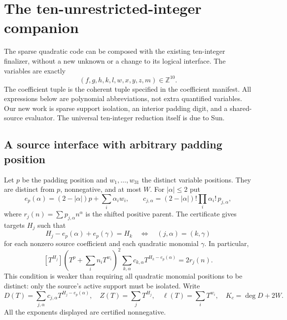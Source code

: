 \section{The ten-unrestricted-integer companion}
\label{sec:sparse-sun}
The sparse quadratic code can be composed with the existing ten-integer
finalizer, without a new unknown or a change to its logical interface.
The variables are exactly
\[
(f,g,h,k,l,w,x,y,z,m)\in\mathbb Z^{10}.
\]
The coefficient tuple is the coherent tuple specified in the coefficient
manifest.  All expressions below are polynomial abbreviations, not extra
quantified variables.  Our new work is sparse support isolation, an
interior padding digit, and a shared-source evaluator.  The universal
ten-integer reduction itself is due to Sun.

\subsection{A source interface with arbitrary padding position}
Let $p$ be the padding position and $w_1,\ldots,w_{31}$ the distinct
variable positions. They are distinct from $p$, nonnegative, and at most
$W$. For $|\alpha|\le2$ put
\[
 e_p(\alpha)=(2-|\alpha|)p+\sum_i\alpha_iw_i,
 \qquad c_{j,\alpha}=(2-|\alpha|)!\prod_i\alpha_i!\,p_{j,\alpha},
\]
where $r_j(n)=\sum p_{j,\alpha}n^\alpha$ is the shifted positive parent.
The certificate gives targets $H_j$ such that
\[
 H_j-e_p(\alpha)+e_p(\gamma)=H_k
 \quad\Longleftrightarrow\quad (j,\alpha)=(k,\gamma)
\]
for each nonzero source coefficient and each quadratic monomial $\gamma$.
In particular,
\[
 [T^{H_j}]\left(T^p+\sum_i n_iT^{w_i}\right)^2
       \sum_{k,\alpha}c_{k,\alpha}T^{H_k-e_p(\alpha)}=2r_j(n).
\]
This condition is weaker than requiring all quadratic monomial positions
to be distinct: only the source's active support must be isolated.
Write
\[
 D(T)=\sum_{j,\alpha}c_{j,\alpha}T^{H_j-e_p(\alpha)},\quad
 Z(T)=\sum_jT^{H_j},\quad \ell(T)=\sum_iT^{w_i},\quad
 K_c=\deg D+2W.
\]
All the exponents displayed are certified nonnegative.

